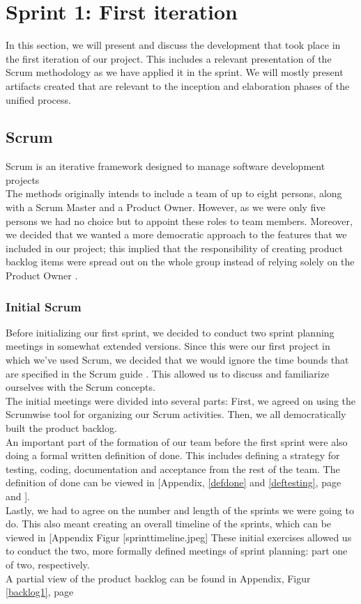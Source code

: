 \section{Sprint 1: First iteration}
In this section, we will present and discuss the development that took place in the first iteration of our project. This includes a relevant presentation of the Scrum methodology as we have applied it in the sprint. We will mostly present artifacts created that are relevant to the inception and elaboration phases of the unified process.
\subsection{Scrum}
Scrum is an iterative framework designed to manage software development projects \cite{scrumguide} \\
The methods originally intends to include a team of up to eight persons, along with a Scrum Master and a Product Owner. However, as we were only five persons we had no choice but to appoint these roles to team members. Moreover, we decided that we wanted a more democratic approach to the features that we included in our project; this implied that the responsibility of creating product backlog items were spread out on the whole group instead of relying solely on the Product Owner \cite[p.~12]{scrumguide}.
\subsubsection{Initial Scrum}
Before initializing our first sprint, we decided to conduct two sprint planning meetings in somewhat extended versions. Since this were our first project in which we’ve used Scrum, we decided that we would ignore the time bounds that are specified in the Scrum guide \cite[p.~9]{scrumguide}. This allowed us to discuss and familiarize ourselves with the Scrum concepts.\\
The initial meetings were divided into several parts: First, we agreed on using the Scrumwise \cite{scrumwise} tool for organizing our Scrum activities. Then, we all democratically built the product backlog. \\
An important part of the formation of our team before the first sprint were also doing a formal written definition of done. This includes defining a strategy for testing, coding, documentation and acceptance from the rest of the team. The definition of done can be viewed in [Appendix, \ref{defdone} and \ref{deftesting}, page \pageref{defdone} and \pageref{deftesting}].\\
Lastly, we had to agree on the number and length of the sprints we were going to do. This also meant creating an overall timeline of the sprints, which can be viewed in [Appendix Figur [sprinttimeline.jpeg]  These initial exercises allowed us to conduct the two, more formally defined meetings of sprint planning: part one of two, respectively. \\
A partial view of the product backlog can be found in Appendix, Figur \ref{backlog1}, page \pageref{backlog1} \\

